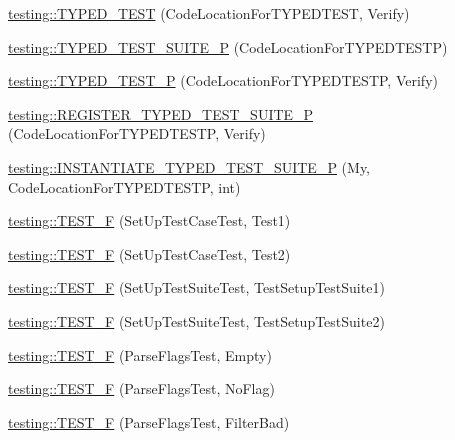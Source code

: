 \begin{DoxyCompactItemize}
\item 
\mbox{\hyperlink{namespacetesting_a400c572f732b06e836d6b3a5adfc4cf7}{testing\+::\+T\+Y\+P\+E\+D\+\_\+\+T\+E\+ST}} (Code\+Location\+For\+T\+Y\+P\+E\+D\+T\+E\+ST, Verify)
\item 
\mbox{\hyperlink{namespacetesting_ab6095d387aee3b6b71919177827e78f5}{testing\+::\+T\+Y\+P\+E\+D\+\_\+\+T\+E\+S\+T\+\_\+\+S\+U\+I\+T\+E\+\_\+P}} (Code\+Location\+For\+T\+Y\+P\+E\+D\+T\+E\+S\+TP)
\item 
\mbox{\hyperlink{namespacetesting_a3f3fbbc7ecc23117307b81deb8f4cfac}{testing\+::\+T\+Y\+P\+E\+D\+\_\+\+T\+E\+S\+T\+\_\+P}} (Code\+Location\+For\+T\+Y\+P\+E\+D\+T\+E\+S\+TP, Verify)
\item 
\mbox{\hyperlink{namespacetesting_ac025be5150f4d250cfd8136063e2f2a1}{testing\+::\+R\+E\+G\+I\+S\+T\+E\+R\+\_\+\+T\+Y\+P\+E\+D\+\_\+\+T\+E\+S\+T\+\_\+\+S\+U\+I\+T\+E\+\_\+P}} (Code\+Location\+For\+T\+Y\+P\+E\+D\+T\+E\+S\+TP, Verify)
\item 
\mbox{\hyperlink{namespacetesting_abc73aa914fde88c645367f862dbe81dd}{testing\+::\+I\+N\+S\+T\+A\+N\+T\+I\+A\+T\+E\+\_\+\+T\+Y\+P\+E\+D\+\_\+\+T\+E\+S\+T\+\_\+\+S\+U\+I\+T\+E\+\_\+P}} (My, Code\+Location\+For\+T\+Y\+P\+E\+D\+T\+E\+S\+TP, int)
\item 
\mbox{\hyperlink{namespacetesting_a01e948eb5427d31f70eafaf472e2bfa8}{testing\+::\+T\+E\+S\+T\+\_\+F}} (Set\+Up\+Test\+Case\+Test, Test1)
\item 
\mbox{\hyperlink{namespacetesting_a8fc2e448ce96e4da357a2129d49e86e3}{testing\+::\+T\+E\+S\+T\+\_\+F}} (Set\+Up\+Test\+Case\+Test, Test2)
\item 
\mbox{\hyperlink{namespacetesting_a071d841c6f97de4f9fd502ed3c24c017}{testing\+::\+T\+E\+S\+T\+\_\+F}} (Set\+Up\+Test\+Suite\+Test, Test\+Setup\+Test\+Suite1)
\item 
\mbox{\hyperlink{namespacetesting_a505d03ad8946d9a4598f8a6754bd2172}{testing\+::\+T\+E\+S\+T\+\_\+F}} (Set\+Up\+Test\+Suite\+Test, Test\+Setup\+Test\+Suite2)
\item 
\mbox{\hyperlink{namespacetesting_a9072b690c3c0e3b6af327fa72fe821c4}{testing\+::\+T\+E\+S\+T\+\_\+F}} (Parse\+Flags\+Test, Empty)
\item 
\mbox{\hyperlink{namespacetesting_ab2b5d94a0dd45cb06473bdd7900e23af}{testing\+::\+T\+E\+S\+T\+\_\+F}} (Parse\+Flags\+Test, No\+Flag)
\item 
\mbox{\hyperlink{namespacetesting_a3b7a3374630035ab3cf2125a0c960435}{testing\+::\+T\+E\+S\+T\+\_\+F}} (Parse\+Flags\+Test, Filter\+Bad)
\item 

\end{DoxyCompactItemize}

